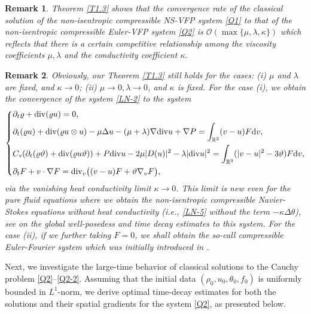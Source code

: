 \documentclass[reqno,11pt]{amsart}
\theoremstyle{plain}
\newtheorem{rem}{Remark}[section]
\numberwithin{equation}{section}
\begin{document}
\begin{rem}
Theorem \ref{T1.3} shows that the convergence 
rate of the classical solution of the non-isentropic compressible NS-VFP 
system \eqref{Q1} to that of the non-isentropic compressible Euler-VFP 
system \eqref{Q2} is $\mathcal{O}(\max\{\mu,\lambda,\kappa\})$ which  
reflects that there is a certain competitive 
relationship among the viscosity coefficients $\mu, \lambda$ and the conductivity coefficient $\kappa$.
\end{rem} 

\begin{rem}
Obviously, our Theorem \ref{T1.3} still holds for the cases: \emph{(i)} 
 $\mu$ and $\lambda$ are fixed, and $ \kappa\rightarrow0$; \emph{(ii)} 
 $\mu \rightarrow 0,  \lambda\rightarrow 0$, and $\kappa $ is fixed. 
 For the case \emph{(i)}, we obtain the convergence of the system \eqref{LN-2} 
 to the system %
 \begin{equation}\label{LN-4}  
\left\{  
\begin{aligned}  
&\partial_t \varrho + {\rm div} (\varrho u) = 0, \\  
&\partial_t (\varrho u) + {\rm div} (\varrho u \otimes u) - \mu \Delta u - (\mu + \lambda)\nabla
 {\rm div} u + \nabla P = \int_{\mathbb{R}^3} (v-u)F\mathrm{d}v, \\  
&C_\textsl{v}(\partial_t (\varrho \vartheta ) + {\rm div} (\varrho u \vartheta )) + P {\rm div} u 
- 2\mu |D(u)|^2 - \lambda|{\rm div} u|^2 = \int_{\mathbb{R}^3} (|v-u|^2 - 3\vartheta )F\mathrm{d}v, \\  
&\partial_t F + v \cdot \nabla F = {\rm div}_v\big((v-u)F + \vartheta \nabla_v F\big), 
\end{aligned}  
\right.  
\end{equation}  
   via the 
  vanishing heat conductivity limit   $\kappa \to 0$. This limit is new even 
  for the pure fluid equations where we obtain the non-isentropic compressible Navier-Stokes 
  equations  without  heat conductivity  (i.e., \eqref{LN-5} without the term $-\kappa \Delta \theta$), see 
  \cite{DM-2008-IUMJ, TW-2025-JMAA} on the global well-posedess and time decay estimates to this system.
  For the case (ii), if we further taking $F=0$, we shall obtain the so-call compressible Euler-Fourier system  which was 
   initially introduced  in  \cite{CFK-15}. 
   
\end{rem} 

Next, we investigate the large-time behavior of classical 
solutions to the Cauchy problem \eqref{Q2}--\eqref{Q2-2}.
 Assuming that the initial data $(\rho_0,u_0,\theta_0,f_0)$ 
 is uniformly bounded in  $L^1$-norm, we derive optimal
 time-decay estimates for both the solutions and their 
 spatial gradients  for the system \eqref{Q2}, as presented below.
\end{document}
